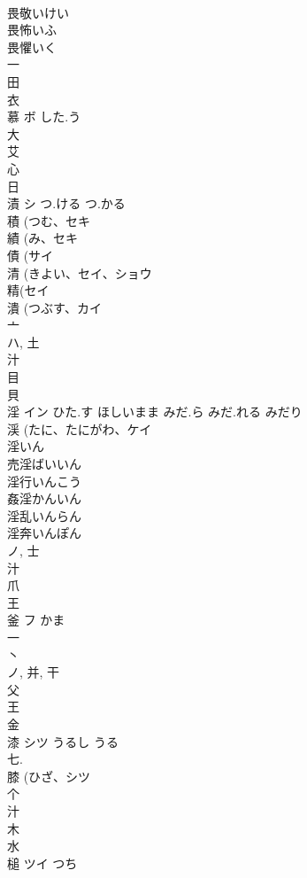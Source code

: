 \documentclass[8pt]{extreport}
\begin{document}
\begin{CJK}{UTF8}{min}
\\	畏敬いけい 
\\	畏怖いふ 
\\	畏懼いく 
\\	一 
\\	田 
\\	衣 
\\	慕	ボ	した.う	
\\	大 
\\	艾 
\\	心 
\\	日 
\\	漬	シ	つ.ける つ.かる	
\\	積 (つむ、セキ 
\\	績 (み、セキ 
\\	債 (サイ 
\\	清 (きよい、セイ、ショウ 
\\	精(セイ 
\\	潰 (つぶす、カイ 
\\	亠 
\\	ハ, 土 
\\	汁 
\\	目 
\\	貝 
\\	淫	イン	ひた.す ほしいまま みだ.ら みだ.れる みだり	
\\	渓 (たに、たにがわ、ケイ 
\\	淫いん
\\	売淫ばいいん
\\	淫行いんこう
\\	姦淫かんいん
\\	淫乱いんらん
\\	淫奔いんぽん
\\	ノ, 士 
\\	汁 
\\	爪 
\\	王 
\\	釜	フ	かま	
\\	一 
\\	丶 
\\	ノ, 并, 干 
\\	父 
\\	王 
\\	金 
\\	漆	シツ	うるし うる	
\\	七. 
\\	膝 (ひざ、シツ 
\\	个 
\\	汁 
\\	木 
\\	水 
\\	槌	ツイ	つち	

\end{CJK}
\end{document}

